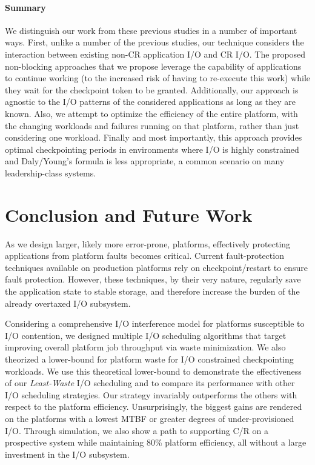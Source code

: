 \documentclass[conference,nofonttune]{IEEEtran}
\newcommand{\leastwaste}{\emph{Least-Waste}\xspace}
\def\cooperative{\leastwaste}
\begin{document}
\paragraph*{Summary}

We distinguish our work from these previous studies in a number of
important ways.  First, unlike a number of the previous studies, our
technique considers the interaction between existing non-CR
application I/O and CR I/O. The proposed non-blocking approaches that
we propose leverage the capability of applications to continue working
(to the increased risk of having to re-execute this work) while they
wait for the checkpoint token to be granted. Additionally, our
approach is agnostic to the I/O patterns of the considered
applications as long as they are known.  Also, we attempt to optimize
the efficiency of the entire platform, with the changing workloads and
failures running on that platform, rather than just considering one
workload. Finally and most importantly, this approach provides optimal
checkpointing periods in environments where I/O is highly constrained
and Daly/Young's formula is less appropriate, a common scenario on
many leadership-class systems.


%
\section{Conclusion and Future Work} \label{sec:conclusion}

As we design larger, likely more error-prone, platforms, effectively protecting
applications from platform faults becomes critical. Current fault-protection
techniques available on production platforms rely on checkpoint/restart to
ensure fault protection. However, these techniques, by their very nature,
regularly save the application state to stable storage, and therefore increase
the burden of the already overtaxed I/O subsystem.

Considering a comprehensive I/O interference model for platforms susceptible to I/O
contention, we designed multiple I/O scheduling algorithms that target improving
overall platform job throughput via waste minimization. We also theorized a
lower-bound for platform waste for I/O constrained checkpointing workloads. We use
this theoretical lower-bound to demonstrate the effectiveness of our \cooperative
I/O scheduling and to compare its performance with other I/O
scheduling strategies.  Our strategy invariably outperforms the others
with respect to the platform efficiency. Unsurprisingly, the biggest gains are
rendered on the platforms with a lowest MTBF or greater degrees of under-provisioned
I/O. Through simulation, we also show a path to supporting C/R on a prospective
system while maintaining 80\% platform efficiency, all without a large
investment in the I/O subsystem.
\end{document}
